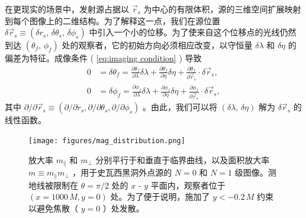 \documentclass[aps,reprint,superscriptaddress,nofootinbib,floatfix,longbibliography,preprintnumbers]{revtex4-1}
\newcommand{\p}{\partial}
\begin{document}
在更现实的场景中，发射源占据以    $\vec{r}_s$    为中心的有限体积，源的三维空间扩展映射到每个图像上的二维结构。为了解释这一点，我们在源位置    $\delta \vec{r}_s \equiv (\delta r_s,\,\delta \theta_s,\,\delta \phi_s)$    中引入一个小的位移。为了使来自这个位移点的光线仍然到达    $(\theta_f,\,\phi_f)$    处的观察者，它的初始方向必须相应改变，以守恒量    $\delta \lambda$    和    $\delta \eta$    的偏差为特征。成像条件 (    \ref{eq:imaging condition}    ) 导致
   \begin{equation}
\begin{aligned}
    0&=\delta\theta_{f}=\frac{\p \theta_{f}}{\p \lambda}\delta\lambda+\frac{\p \theta_{f}}{\p \eta}\delta\eta+\frac{\p \theta_{f}}{\p \vec{r}_s}\cdot\delta \vec{r}_s,  \\  
    0&=\delta\phi_{f}=\frac{\p \phi_{f}}{\p \lambda}\delta\lambda+\frac{\p \phi{_{f}}}{\p \eta}\delta\eta+\frac{\p \phi{_{f}}}{\p \vec{r}_s}\cdot\delta \vec{r}_s,
\end{aligned}
\end{equation}    其中    $\p/\p\vec{r}_s \equiv (\p/\p r_s, \p/\p \theta_s, \p/\p \phi_s)$    。由此，我们可以将    $(\delta \lambda,\, \delta \eta)$    解为    $\delta \vec{r}_s$    的线性函数。  

   \begin{figure}
    \centering
    \texttt{[image: figures/mag\_distribution.png]}
    \caption{放大率    $m_{\parallel}$    和    $m_{\perp}$    分别平行于和垂直于临界曲线，以及面积放大率    $m \equiv m_{\parallel}m_{\perp}$    ，用于史瓦西黑洞外点源的    $N=0$    和    $N=1$    级图像。测地线被限制在    $\theta = \pi/2$    处的    $x$    -    $y$    平面内，观察者位于    $(x=1000\,M, y=0)$    处。为了便于说明，施加了    $y < -0.2\,M$    约束以避免焦散（   $y=0$   ）处发散。  }
    \label{fig:mag distribution}
\end{figure}     
\end{document}

